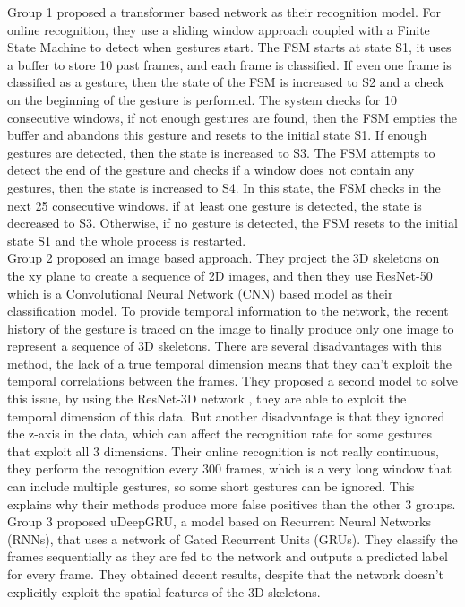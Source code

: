 Group 1 \cite{shrec21} proposed a transformer based network as their recognition model. For online recognition, they use a sliding window approach coupled with a Finite State Machine to detect when gestures start. The FSM starts at state S1, it uses a buffer to store 10 past frames, and each frame is classified. If even one frame is classified as a gesture, then the state of the FSM is increased to S2 and a check on the beginning of the gesture is performed. The system checks for 10 consecutive windows, if not enough gestures are found, then the FSM empties the buffer and abandons this gesture and resets to the initial state S1. If enough gestures are detected, then the state is increased  to S3. The FSM attempts to detect the end of the gesture and checks if a window does not contain any gestures, then the state is increased to S4. In this state, the FSM checks in the next 25 consecutive windows. if at least one gesture is detected, the state is decreased to S3. Otherwise, if no gesture is detected, the FSM resets to the initial state S1 and the whole process is restarted. \\
Group 2 \cite{shrec21} proposed an image based approach. They project the 3D skeletons on the xy plane to create a sequence of 2D images, and then  they use ResNet-50 \cite{he2016deep} which is a Convolutional Neural Network (CNN) based model as their classification model. To provide temporal information to the network, the recent history of the gesture is traced on the image to finally produce only one image to represent a sequence of 3D skeletons. There are several disadvantages with this method, the lack of a true temporal dimension means that they can't exploit the temporal correlations between the frames. They proposed a second model to solve this issue, by using the ResNet-3D network \cite{hara2018can}, they are able to exploit the temporal dimension of this data. But another disadvantage is that they ignored the z-axis in the data, which can affect the recognition rate for some gestures that exploit all 3 dimensions. Their online recognition is not really continuous, they perform the recognition every 300 frames, which is a very long window that can include multiple gestures, so some short gestures can be ignored. This explains why their methods produce more false positives than the other 3 groups. \\
Group 3 \cite{shrec21} proposed uDeepGRU, a model based on Recurrent Neural Networks (RNNs), that uses a network of Gated Recurrent Units (GRUs). They classify the frames sequentially as they are fed to the network and outputs a predicted label for every frame. They obtained decent results, despite that the network doesn't explicitly exploit the spatial features of the 3D skeletons.\\
